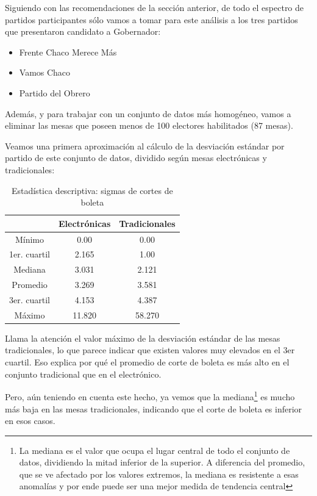 \documentclass[12pt,a4paper]{article}
\begin{document}
Siguiendo con las recomendaciones de la sección anterior, de todo el espectro de
partidos participantes sólo vamos a tomar para este análisis a los tres partidos
que presentaron candidato a Gobernador:

\begin{itemize}
  \item Frente Chaco Merece Más
  \item Vamos Chaco
  \item Partido del Obrero
\end{itemize}

Además, y para trabajar con un conjunto de datos más homogéneo, vamos a eliminar
las mesas que poseen menos de 100 electores habilitados (87 mesas).

Veamos una primera aproximación al cálculo de la desviación estándar por partido
de este conjunto de datos, dividido según mesas electrónicas y tradicionales:

\begin{table}[h!]
\centering
\label{my-label}
\begin{tabular}{c c c}
 & Electrónicas & Tradicionales \\
\hline
Mínimo & 0.00 & 0.00 \\
1er. cuartil & 2.165 & 1.00 \\
Mediana & 3.031 & 2.121 \\
Promedio & 3.269 & 3.581 \\
3er. cuartil & 4.153 & 4.387 \\
Máximo & 11.820 & 58.270 \\
\hline
\end{tabular}
\caption{Estadística descriptiva: sigmas de cortes de boleta}
\label{table:1}
\end{table}

Llama la atención el valor máximo de la desviación estándar de las mesas
tradicionales, lo que parece indicar que existen valores muy elevados en el 3er
cuartil. Eso explica por qué el promedio de corte de boleta es más alto en el
conjunto tradicional que en el electrónico.

Pero, aún teniendo en cuenta este hecho, ya vemos que la mediana\footnote{La
  mediana es el valor que ocupa el lugar central de todo el conjunto de datos,
  dividiendo la mitad inferior de la superior. A diferencia del promedio, que se
ve afectado por los valores extremos, la mediana es resistente a esas anomalías
y por ende puede ser una mejor medida de tendencia central} es mucho más baja
en las mesas tradicionales, indicando que el corte de boleta es inferior en esos casos.
\end{document}
